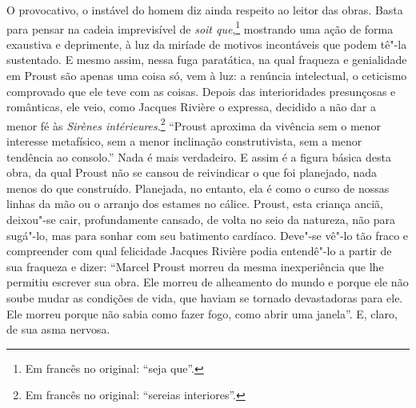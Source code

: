 O provocativo, o instável do homem diz ainda respeito ao leitor das
obras. Basta para pensar na cadeia imprevisível de \emph{soit
que},\footnote{Em francês no original: ``seja que''. \versal{[N.~T.]}} mostrando uma ação de forma
exaustiva e deprimente, à luz da miríade de motivos incontáveis que
podem tê"-la sustentado. E mesmo assim, nessa fuga paratática, na qual
fraqueza e genialidade em Proust são apenas uma coisa só, vem à luz: a
renúncia intelectual, o ceticismo comprovado que ele teve com as coisas.
Depois das interioridades presunçosas e românticas, ele veio, como
Jacques Rivière o expressa, decidido a não dar a menor fé às \emph{Sirènes
intérieures}.\footnote{Em francês no original: ``sereias interiores''. \versal{[N.~T.]}} ``Proust aproxima
da vivência sem o menor interesse metafísico, sem a menor inclinação
construtivista, sem a menor tendência ao consolo.'' Nada é mais
verdadeiro. E assim é a figura básica desta obra, da qual Proust não se
cansou de reivindicar o que foi planejado, nada menos do que construído.
Planejada, no entanto, ela é como o curso de nossas linhas da mão ou o
arranjo dos estames no cálice. Proust, esta criança anciã, deixou"-se
cair, profundamente cansado, de volta no seio da natureza, não para
sugá"-lo, mas para sonhar com seu batimento cardíaco. Deve"-se vê"-lo tão
fraco e compreender com qual felicidade Jacques Rivière podia entendê"-lo
a partir de sua fraqueza e dizer: ``Marcel Proust morreu da mesma
inexperiência que lhe permitiu escrever sua obra. Ele morreu de
alheamento do mundo e porque ele não soube mudar as condições de vida,
que haviam se tornado devastadoras para ele. Ele morreu porque não sabia
como fazer fogo, como abrir uma janela''. E, claro, de sua asma nervosa.

